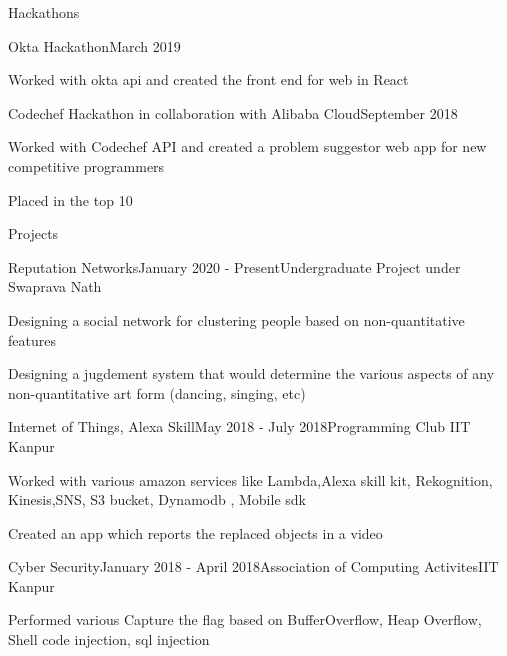 \documentclass{resume}
\begin{document}
\begin{rSection}{Hackathons}

\begin{rSubsection}{Okta Hackathon}{March 2019}{}{}

\item Worked with okta api and created the front end for web in React

\end{rSubsection}

\begin{rSubsection}{Codechef Hackathon in collaboration with Alibaba Cloud}{September 2018}{}{}

\item Worked with Codechef API and created a problem suggestor web app for new competitive programmers
\item Placed in the top 10

\end{rSubsection}

\end{rSection}
\clearpage
\begin{rSection}{Projects}

\begin{rSubsection}{Reputation Networks}{January 2020 - Present}{Undergraduate Project under Swaprava Nath}{}
\item Designing a social network for clustering people based on non-quantitative features
\item Designing a jugdement system that would determine the various aspects of any non-quantitative art form (dancing, singing, etc)
\end{rSubsection}

\begin{rSubsection}{Internet of Things, Alexa Skill}{May 2018 - July 2018}{Programming Club IIT Kanpur}{}
\item Worked with various amazon services like Lambda,Alexa skill kit, Rekognition, Kinesis,SNS, S3 bucket, Dynamodb , Mobile sdk
\item Created an app which reports the replaced objects in a video
\end{rSubsection}


\begin{rSubsection}{Cyber Security}{January 2018 - April 2018}{Association of Computing Activites}{IIT Kanpur}
\item Performed various Capture the flag based on BufferOverflow, Heap Overflow, Shell code injection, sql injection
\end{rSubsection}

\end{rSection}
\end{document}
